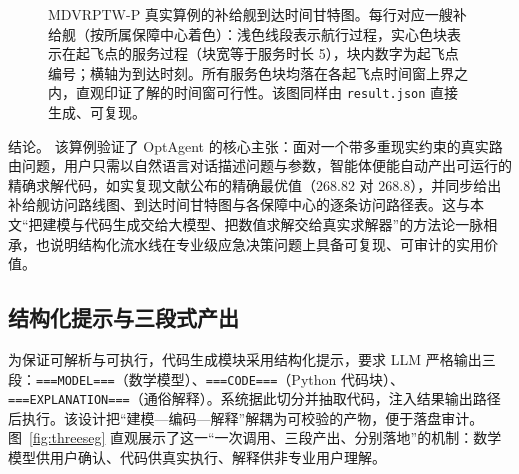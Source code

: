 \documentclass[11pt]{article}
\begin{document}
\begin{figure}[t]
\centering
\resizebox{0.92\linewidth}{!}{%
}
\caption{MDVRPTW-P 真实算例的补给舰到达时间甘特图。每行对应一艘补给舰（按所属保障中心着色）：浅色线段表示航行过程，实心色块表示在起飞点的服务过程（块宽等于服务时长 5），块内数字为起飞点编号；横轴为到达时刻。所有服务色块均落在各起飞点时间窗上界之内，直观印证了解的时间窗可行性。该图同样由 \texttt{result.json} 直接生成、可复现。}
\label{fig:mdvrptw-gantt}
\end{figure}

结论。 该算例验证了 OptAgent 的核心主张：面对一个带多重现实约束的真实路由问题，用户只需以自然语言对话描述问题与参数，智能体便能自动产出可运行的精确求解代码，如实复现文献公布的精确最优值（$268.82$ 对 $268.8$），并同步给出补给舰访问路线图、到达时间甘特图与各保障中心的逐条访问路径表。这与本文“把建模与代码生成交给大模型、把数值求解交给真实求解器”的方法论一脉相承，也说明结构化流水线在专业级应急决策问题上具备可复现、可审计的实用价值。

\subsection{结构化提示与三段式产出}
为保证可解析与可执行，代码生成模块采用结构化提示，要求 LLM 严格输出三段：\texttt{===MODEL===}（数学模型）、\texttt{===CODE===}（Python 代码块）、\texttt{===EXPLANATION===}（通俗解释）。系统据此切分并抽取代码，注入结果输出路径后执行。该设计把“建模—编码—解释”解耦为可校验的产物，便于落盘审计。图~\ref{fig:threeseg} 直观展示了这一“一次调用、三段产出、分别落地”的机制：数学模型供用户确认、代码供真实执行、解释供非专业用户理解。
\end{document}
